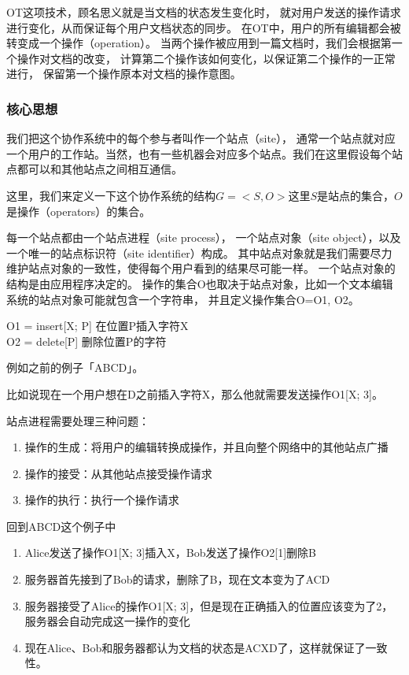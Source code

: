 \documentclass[11pt]{article}
\begin{document}
OT这项技术，顾名思义就是当文档的状态发生变化时，
就对用户发送的操作请求进行变化，从而保证每个用户文档状态的同步。
在OT中，用户的所有编辑都会被转变成一个操作（operation）。
当两个操作被应用到一篇文档时，我们会根据第一个操作对文档的改变，
计算第二个操作该如何变化，以保证第二个操作的一正常进行，
保留第一个操作原本对文档的操作意图。

\subsubsection{核心思想}
我们把这个协作系统中的每个参与者叫作一个站点（site），
通常一个站点就对应一个用户的工作站。当然，也有一些机器会对应多个站点。我们在这里假设每个站点都可以和其他站点之间相互通信。

这里，我们来定义一下这个协作系统的结构$G=<S, O>$这里$S$是站点的集合，$O$是操作（operators）的集合。

每一个站点都由一个站点进程（site process），
一个站点对象（site object），以及一个唯一的站点标识符（site identifier）构成。
其中站点对象就是我们需要尽力维护站点对象的一致性，使得每个用户看到的结果尽可能一样。
一个站点对象的结构是由应用程序决定的。 操作的集合O也取决于站点对象，比如一个文本编辑系统的站点对象可能就包含一个字符串，
并且定义操作集合O={O1, O2}。
\begin{center}
O1 = insert[X; P]   在位置P插入字符X\\
O2 = delete[P]	    删除位置P的字符
\end{center}

例如之前的例子「ABCD」。

比如说现在一个用户想在D之前插入字符X，那么他就需要发送操作O1[X; 3]。

站点进程需要处理三种问题：
\begin{enumerate}
    \item 操作的生成：将用户的编辑转换成操作，并且向整个网络中的其他站点广播
    \item 操作的接受：从其他站点接受操作请求
    \item 操作的执行：执行一个操作请求
\end{enumerate}

回到ABCD这个例子中
\begin{enumerate}
    \item Alice发送了操作O1[X; 3]插入X，Bob发送了操作O2[1]删除B
    \item 服务器首先接到了Bob的请求，删除了B，现在文本变为了ACD
    \item 服务器接受了Alice的操作O1[X; 3]，但是现在正确插入的位置应该变为了2，服务器会自动完成这一操作的变化
    \item 现在Alice、Bob和服务器都认为文档的状态是ACXD了，这样就保证了一致性。
\end{enumerate}
\end{document}

